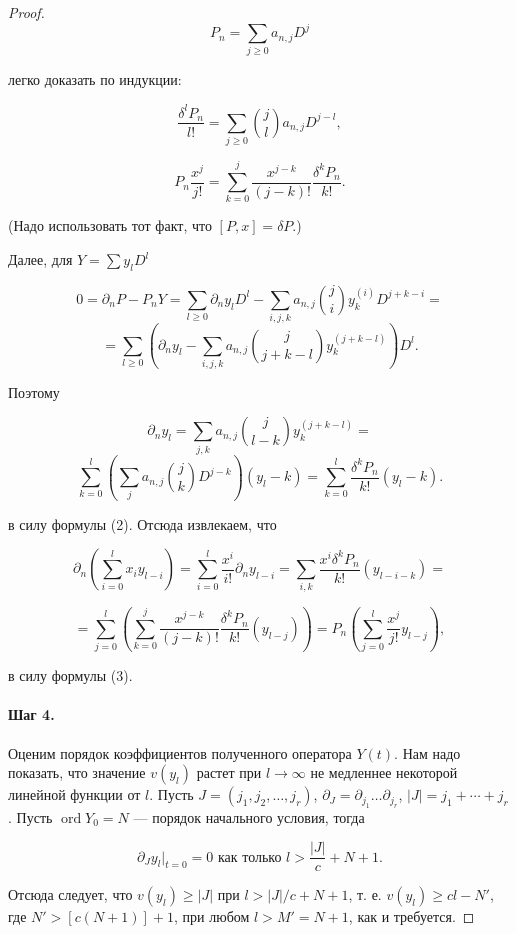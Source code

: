 \documentclass{article}
\theoremstyle{definition}
\theoremstyle{definition} %
\theoremstyle{remark}     %
\theoremstyle{definition}
\theoremstyle{definition}
\theoremstyle{definition}
\theoremstyle{definition}
\theoremstyle{definition}
\theoremstyle{definition}
\theoremstyle{definition}
\theoremstyle{definition}
\begin{document}
\begin{proof}
\[
P_n = \sum_{j \geq 0} a_{n,j} D^j
\]

легко доказать по индукции:  

\[
\frac{\delta^l P_n}{l!} = \sum_{j \geq 0} \binom{j}{l} a_{n,j} D^{j-l}, \tag{2}
\]

\[
P_n \frac{x^j}{j!} = \sum_{k=0}^j \frac{x^{j-k}}{(j-k)!} \frac{\delta^k P_n}{k!}. \tag{3}
\]

(Надо использовать тот факт, что \([P, x] = \delta P\).)  

Далее, для \(Y = \sum y_l D^l\)  

\[
0 = \partial_n P - P_n Y = \sum_{l \geq 0} \partial_n y_l D^l - \sum_{i,j,k} a_{n,j} \binom{j}{i} y_k^{(i)} D^{j+k-i} =
\]  
\[
= \sum_{l \geq 0} \left( \partial_n y_l - \sum_{i,j,k} a_{n,j} \binom{j}{j+k-l} y_k^{(j+k-l)} \right) D^l.
\]

Поэтому  

\[
\partial_n y_l = \sum_{j,k} a_{n,j} \binom{j}{l-k} y_k^{(j+k-l)} =
\]  
\[
\sum_{k=0}^l \left( \sum_{j} a_{n,j} \binom{j}{k} D^{j-k} \right) (y_l - k) = \sum_{k=0}^l \frac{\delta^k P_n}{k!} (y_l - k). \tag{4}
\]



в силу формулы (2). Отсюда извлекаем, что

\[
\partial_n \left( \sum_{i=0}^l x_i y_{l-i} \right) = \sum_{i=0}^l \frac{x^i}{i!} \partial_n y_{l-i} = \sum_{i,k} \frac{x^i \delta^k P_n}{k!} (y_{l-i-k}) =
\]

\[
= \sum_{j=0}^l \left( \sum_{k=0}^j \frac{x^{j-k}}{(j-k)!} \frac{\delta^k P_n}{k!} (y_{l-j}) \right) = P_n \left( \sum_{j=0}^l \frac{x^j}{j!} y_{l-j} \right),
\]

в силу формулы (3).

\paragraph{Шаг 4.} Оценим порядок коэффициентов полученного оператора \(Y(t)\). Нам надо показать, что значение \(v(y_l)\) растет при \(l \to \infty\) не медленнее некоторой линейной функции от \(l\). Пусть \(J = (j_1, j_2, \dots, j_r)\), \(\partial_J = \partial_{j_1} \dots \partial_{j_r}\), \(|J| = j_1 + \cdots + j_r\). Пусть \(\operatorname{ord} Y_0 = N\) — порядок начального условия, тогда

\[
\partial_J y_l|_{t=0} = 0 \text{ как только } l > \frac{|J|}{c} + N + 1.
\]



Отсюда следует, что \(v(y_l) \ge |J|\) при \(l > |J|/c + N + 1\), т. е. \(v(y_l) \ge cl - N'\), где  
\(N' > [c(N + 1)] + 1\), при любом \(l > M' = N + 1\), как и требуется.  


\end{proof}
\end{document}
